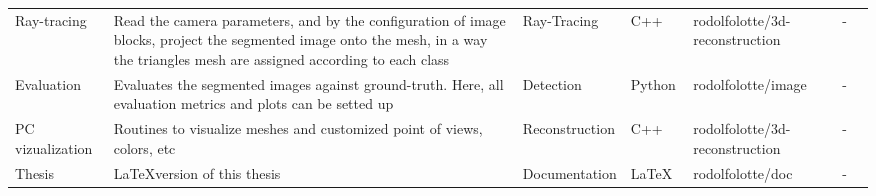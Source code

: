 \begin{table}[H]
\begin{tabular}{L{1.3cm}|L{4cm}|C{2.2cm}|C{1.2cm}|C{2.5cm}|C{0.7cm}|C{0.7cm}}
	      Ray-tracing & Read the camera parameters, and by the configuration of image blocks, project the segmented image onto the mesh, in a way the triangles mesh are assigned according to each class & Ray-Tracing & C++ & rodolfolotte/3d-reconstruction & - & \href{https://github.com/rodolfolotte/3d-reconstruction}{\faGithub}\\	      
	      Evaluation & Evaluates the segmented images against ground-truth. Here, all evaluation metrics and plots can be setted up & Detection & Python & rodolfolotte/image & - & \href{https://github.com/rodolfolotte/image/tree/master/evaluation}{\faGithub}\\	      
	      PC vizualization & Routines to visualize meshes and customized point of views, colors, etc & Reconstruction & C++ & rodolfolotte/3d-reconstruction & - & \href{https://github.com/rodolfolotte/3d-reconstruction}{\faGithub}\\ \hline
	      Thesis & \LaTeX version of this thesis & Documentation & \LaTeX\ & rodolfolotte/doc & - & \href{https://github.com/rodolfolotte/documentation}{\faGithub}\\
	      \bottomrule	
      \end{tabular}
      \label{tools-developed}
    \end{table}




    
    

